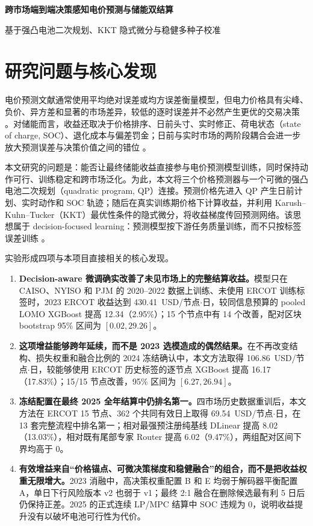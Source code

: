 \documentclass[UTF8,a4paper,11pt,fontset=fandol]{ctexart}
\newcommand{\usdnode}{USD/节点$\cdot$日}
\begin{document}
\sloppy
\pagestyle{plain}

\begin{center}
  \vspace*{8mm}
  {\LARGE\bfseries 跨市场端到端决策感知电价预测与储能双结算\par}
  \vspace{2mm}
  {\large 基于强凸电池二次规划、KKT 隐式微分与稳健多种子校准\par}
  \vspace{7mm}
\end{center}

\section{研究问题与核心发现}

电价预测文献通常使用平均绝对误差或均方误差衡量模型，但电力价格具有尖峰、负价、异方差和显著的市场差异，较低的逐时误差并不必然产生更优的交易决策
\cite{weron2014,lago2021}。对储能而言，收益还取决于价格排序、日前头寸、实时修正、荷电状态（state of charge, SOC）、退化成本与偏差罚金；日前与实时市场的两阶段耦合会进一步放大预测误差与决策价值之间的错位
\cite{krishnamurthy2018,alghumayjan2024}。

本文研究的问题是：能否让最终储能收益直接参与电价预测模型训练，同时保持动作可行、训练稳定和跨市场泛化。为此，本文将三个价格预测器与一个可微的强凸电池二次规划（quadratic program, QP）连接。预测价格先进入 QP 产生日前计划、实时动作和 SOC 轨迹；随后在真实训练期价格下计算收益，并利用 Karush--Kuhn--Tucker（KKT）最优性条件的隐式微分，将收益梯度传回预测网络。该思想属于 decision-focused learning：预测模型按下游任务质量训练，而不只按标签误差训练
\cite{donti2017,mandi2024}。

实验形成四项与本项目直接相关的核心发现。
\begin{enumerate}
  \item \textbf{Decision-aware 微调确实改善了未见市场上的完整结算收益。}模型只在 CAISO、NYISO 和 PJM 的 2020--2022 数据上训练、未使用 ERCOT 训练标签时，2023 ERCOT 收益达到 430.41~\usdnode，较同信息预算的 pooled LOMO XGBoost 提高 12.34（2.95\%）；15 个节点中有 14 个改善，配对区块 bootstrap 95\% 区间为 $[0.02,29.26]$。
  \item \textbf{这项增益能够跨年延续，而不是 2023 选模造成的偶然结果。}在不再改变结构、损失权重和融合比例的 2024 冻结确认中，本文方法取得 106.86~\usdnode，较能够使用 ERCOT 历史标签的逐节点 XGBoost 提高 16.17（17.83\%）；15/15 节点改善，95\% 区间为 $[6.27,26.94]$。
  \item \textbf{冻结配置在最终 2025 全年结算中仍排名第一。}四市场历史数据重训后，本文方法在 ERCOT 15 节点、362 个共同有效日上取得 69.54~\usdnode，在 13 套完整流程中排名第一；相对最强预注册纯基线 DLinear 提高 8.02（13.03\%），相对既有尾部专家 Router 提高 6.02（9.47\%），两组配对区间下界均高于 0。
  \item \textbf{有效增益来自“价格锚点、可微决策梯度和稳健融合”的组合，而不是把收益权重无限增大。}2023 消融中，高决策权重配置 B 和 E 均弱于解码器平衡配置 A，单日下行风险版本 v2 也弱于 v1；最终 2:1 融合在删除候选最有利 5 日后仍保持正差。2025 的正式连续 LP/MPC 结算中 SOC 违规为 0，说明收益提升没有以破坏电池可行性为代价。
\end{enumerate}
\end{document}
